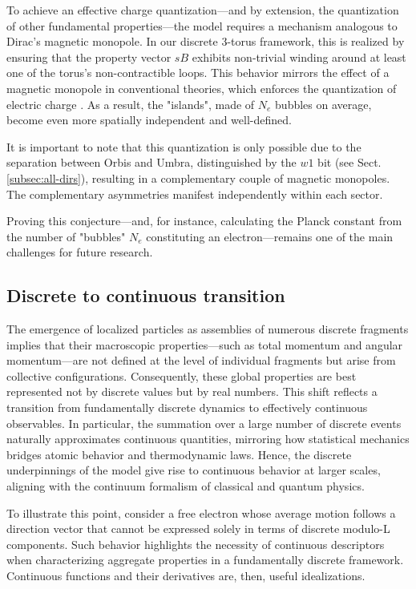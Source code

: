 \documentclass[12pt,english]{article}
\begin{document}
To achieve an effective charge quantization—and by extension, the quantization of other fundamental properties—the model requires a mechanism analogous to Dirac's magnetic monopole. In our discrete 3-torus framework, this is realized by ensuring that the property vector $sB$ exhibits non-trivial winding around at least one of the torus’s non-contractible loops. This behavior mirrors the effect of a magnetic monopole in conventional theories, which enforces the quantization of electric charge \cite{dirac1931}. As a result, the "islands", made of $N_e$ bubbles on average, become even more spatially independent and well-defined.

It is important to note that this quantization is only possible due to the separation between Orbis and Umbra, distinguished by the $w1$ bit (see Sect. \ref{subsec:all-dirs}), resulting in a complementary couple of magnetic monopoles. The complementary asymmetries manifest independently within each sector.

Proving this conjecture—and, for instance, calculating the Planck constant from the number of "bubbles" $N_e$ constituting an electron—remains one of the main challenges for future research.

\subsection{Discrete to continuous transition}

The emergence of localized particles as assemblies of numerous discrete fragments implies that their macroscopic properties—such as total momentum and angular momentum—are not defined at the level of individual fragments but arise from collective configurations. Consequently, these global properties are best represented not by discrete values but by real numbers. This shift reflects a transition from fundamentally discrete dynamics to effectively continuous observables. In particular, the summation over a large number of discrete events naturally approximates continuous quantities, mirroring how statistical mechanics bridges atomic behavior and thermodynamic laws. Hence, the discrete underpinnings of the model give rise to continuous behavior at larger scales, aligning with the continuum formalism of classical and quantum physics.

To illustrate this point, consider a free electron whose average motion follows a direction vector that cannot be expressed solely in terms of discrete modulo-L components. Such behavior highlights the necessity of continuous descriptors when characterizing aggregate properties in a fundamentally discrete framework. Continuous functions and their derivatives are, then, useful idealizations.
\end{document}

